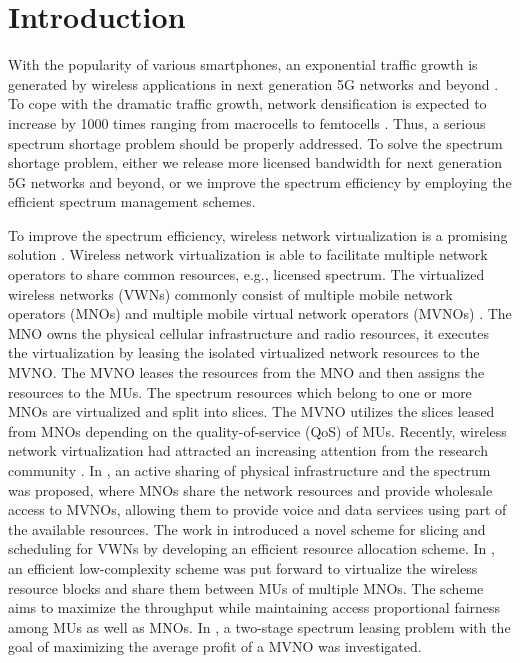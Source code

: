 \documentclass[journal]{IEEEtran}
\begin{document}
\section{Introduction}

With the popularity of various {\color{red} smartphones}, an exponential traffic growth is generated by wireless applications in next generation 5G networks and beyond \cite{NPanwar,DingZ14,LiY17,LiY18}. To cope with the dramatic traffic growth, network densification is expected to increase by 1000 times ranging from macrocells to femtocells \cite{AYDing}. Thus, a serious spectrum shortage problem should be properly addressed. To solve the spectrum shortage problem, either we release more licensed bandwidth for next generation 5G networks and beyond, or we improve the spectrum efficiency by employing the efficient spectrum management schemes.

To improve the spectrum efficiency, wireless network virtualization is a promising solution \cite{CLiang,LZhao,3GPP}. Wireless network virtualization is able to facilitate multiple network operators to share common resources, e.g., licensed spectrum. The virtualized wireless networks (VWNs) commonly consist of multiple mobile network operators (MNOs) and multiple mobile virtual network operators (MVNOs) \cite{RKokku}. The MNO owns the physical cellular infrastructure and radio resources, it executes the virtualization by leasing the isolated virtualized network resources to the MVNO. The MVNO leases the resources from the MNO and then assigns the resources to the MUs. The spectrum resources which belong to one or more MNOs are virtualized and {\color{red}split} into slices. The MVNO utilizes the slices leased from MNOs depending on the quality-of-service (QoS) of MUs. Recently, wireless network virtualization had attracted an increasing attention from the research community \cite{XCostaPerez,MIKamel,MKalil,YXZhang}. In \cite{XCostaPerez}, an active sharing of physical infrastructure and the spectrum was proposed, where MNOs share the network resources and provide wholesale access to MVNOs, allowing them to provide voice and data services using part of the available resources. The work in \cite{MIKamel} introduced a novel scheme for slicing and scheduling for VWNs by developing an efficient resource allocation scheme. In \cite{MKalil}, an efficient low-complexity scheme was put forward to virtualize the wireless resource blocks and share them between MUs of multiple MNOs. The scheme aims to maximize the throughput while maintaining access proportional fairness among MUs as well as MNOs. In \cite{YXZhang}, a two-stage spectrum leasing problem with the goal of maximizing the average profit of a {\color{red} MVNO} was investigated.
\end{document}
